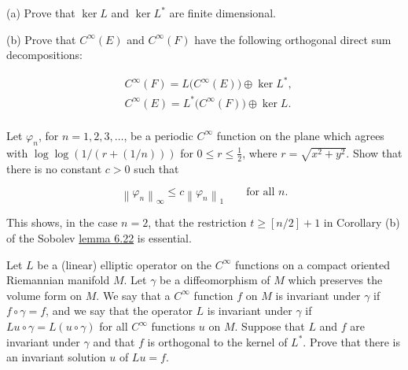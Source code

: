 \begin{problemset}
(a) Prove that $\ker L$ and $\ker L^{*}$ are finite dimensional.

(b) Prove that  $ C^{\infty}(E) $ and  $ C^{\infty}(F) $ have the following orthogonal direct sum decompositions:

\[
\begin{aligned}{}&{{}C^{\infty}(F)=L\big(C^{\infty}(E)\big)\oplus\ker L^{*},}\\ {}&{{}C^{\infty}(E)=L^{*}\big(C^{\infty}(F)\big)\oplus\ker L.}\\ \end{aligned}
\]

\item Let $\varphi_n$, for $n=1,2,3,\ldots$, be a periodic $C^\infty$ function on the plane which agrees with $\log \log(1/(r+(1/n)))$ for $0 \leq r \leq \frac{1}{2}$, where $r = \sqrt{x^2 + y^2}$. Show that there is no constant $c > 0$ such that

\[
\left\|\varphi_{n}\right\|_{\infty}\leq c\left\|\varphi_{n}\right\|_{1}\qquad\text{for all }n.
\]

This shows, in the case $n=2$, that the restriction $t\geq[n/2]+1$ in Corollary (b) of the Sobolev \hyperref[thm:6.22]{lemma 6.22} is essential.

\item Let $L$ be a (linear) elliptic operator on the $C^\infty$ functions on a compact oriented Riemannian manifold $M$. Let $\gamma$ be a diffeomorphism of $M$ which preserves the volume form on $M$. We say that a $C^\infty$ function $f$ on $M$ is invariant under $\gamma$ if $f\circ\gamma=f$, and we say that the operator $L$ is invariant under $\gamma$ if $Lu\circ\gamma=L(u\circ\gamma)$ for all $C^\infty$ functions $u$ on $M$. Suppose that $L$ and $f$ are invariant under $\gamma$ and that $f$ is orthogonal to the kernel of $L^*$. Prove that there is an invariant solution $u$ of $Lu=f$.

\end{problemset}
